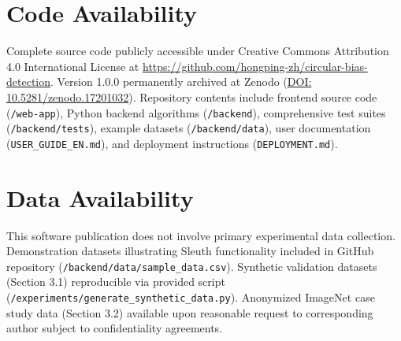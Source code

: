 \documentclass[10pt]{article}
\begin{document}
\section*{Code Availability}

Complete source code publicly accessible under Creative Commons Attribution 4.0 International License at \url{https://github.com/hongping-zh/circular-bias-detection}. Version 1.0.0 permanently archived at Zenodo (\href{https://doi.org/10.5281/zenodo.17201032}{DOI: 10.5281/zenodo.17201032}). Repository contents include frontend source code (\texttt{/web-app}), Python backend algorithms (\texttt{/backend}), comprehensive test suites (\texttt{/backend/tests}), example datasets (\texttt{/backend/data}), user documentation (\texttt{USER\_GUIDE\_EN.md}), and deployment instructions (\texttt{DEPLOYMENT.md}).

\section*{Data Availability}

This software publication does not involve primary experimental data collection. Demonstration datasets illustrating Sleuth functionality included in GitHub repository (\texttt{/backend/data/sample\_data.csv}). Synthetic validation datasets (Section 3.1) reproducible via provided script (\texttt{/experiments/generate\_synthetic\_data.py}). Anonymized ImageNet case study data (Section 3.2) available upon reasonable request to corresponding author subject to confidentiality agreements.
\end{document}
